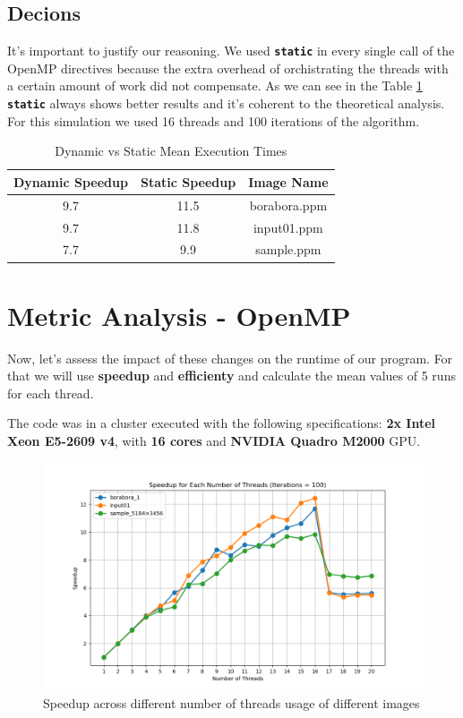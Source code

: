 \documentclass[sigconf]{acmart}
\begin{document}
\subsection{Decions}
It's important to justify our reasoning. We used \texttt{\textbf{static}} in every single call of the OpenMP directives because the extra overhead of orchistrating the threads with a certain amount of work did not compensate. As we can see in the Table \ref{table:staticanddynamic} \texttt{\textbf{static}} always shows better results and it's coherent to the theoretical analysis. For this simulation we used 16 threads and 100 iterations of the algorithm.

\begin{table}[h!]
\centering
\begin{tabular}{|c|c|c|}
\hline
\textbf{Dynamic Speedup} & \textbf{Static Speedup} & \textbf{Image Name} \\
\hline
9.7 & 11.5& borabora.ppm \\
\hline
9.7 & 11.8 & input01.ppm \\
\hline
7.7 & 9.9 & sample.ppm \\
\hline
\end{tabular}
\vspace{0.2cm} %
\caption{Dynamic vs Static Mean Execution Times}
\label{table:staticanddynamic}
\end{table}

\section{Metric Analysis - OpenMP}
Now, let's assess the impact of these changes on the runtime of our program. For that we will use \textbf{speedup} and \textbf{efficienty} and calculate the mean values of 5 runs for each thread.

The code was in a cluster executed with the following specifications: \textbf{2x Intel Xeon E5-2609 v4}, with \textbf{16 cores} and \textbf{NVIDIA Quadro M2000} GPU.

\begin{figure}[h]
  \centering
  \includegraphics[width=\linewidth]{images/openMP.png}
  \caption{Speedup across different number of threads usage of different images}
 \label{fig1}
\end{figure}
\end{document}
